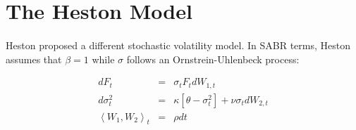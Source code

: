 \documentclass{article}
\begin{document}
\section{The Heston Model}
\paragraph{} Heston \cite{heston1993} proposed a different stochastic volatility model. In SABR terms, Heston assumes that $\beta = 1$ while $\sigma$ follows an Ornstrein-Uhlenbeck process: 

\begin{eqnarray}
    dF_t      & = & \sigma_t F_t dW_{1, t}\\
    d\sigma_t^2 & = & \kappa\left[\theta - \sigma_t^2\right] + \nu\sigma_t dW_{2, t}\\
	\left<W_{1}, W_{2}\right>_t & = & \rho dt
\end{eqnarray}

\end{document}
